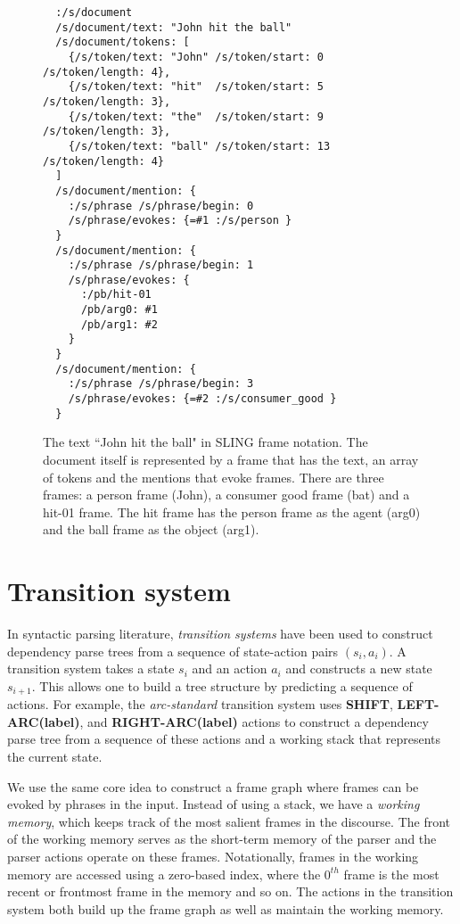 \documentclass[11pt,a4paper]{article}
\begin{document}
\begin{figure*}[t]
  \begin{verbatim}
  :/s/document
  /s/document/text: "John hit the ball"
  /s/document/tokens: [
    {/s/token/text: "John" /s/token/start: 0  /s/token/length: 4},
    {/s/token/text: "hit"  /s/token/start: 5  /s/token/length: 3},
    {/s/token/text: "the"  /s/token/start: 9  /s/token/length: 3},
    {/s/token/text: "ball" /s/token/start: 13 /s/token/length: 4}
  ]
  /s/document/mention: {
    :/s/phrase /s/phrase/begin: 0
    /s/phrase/evokes: {=#1 :/s/person }
  }
  /s/document/mention: {
    :/s/phrase /s/phrase/begin: 1
    /s/phrase/evokes: {
      :/pb/hit-01
      /pb/arg0: #1
      /pb/arg1: #2
    }
  }
  /s/document/mention: {
    :/s/phrase /s/phrase/begin: 3
    /s/phrase/evokes: {=#2 :/s/consumer_good }
  }
\end{verbatim}
  \caption{The text ``John hit the ball" in SLING frame notation. The document
  itself is represented by a frame that has the text, an array of tokens and
  the mentions that evoke frames. There are three frames: a person frame (John),
  a consumer good frame (bat) and a hit-01 frame. The hit frame has the person
  frame as the agent (arg0) and the ball frame as the object (arg1).}
  \label{fig:slingdoc}
\end{figure*}

\section{Transition system}
\label{sec:ts}

In syntactic parsing literature, \emph{transition systems} have been
used to construct dependency parse trees from a sequence of state-action pairs
$(s_i,a_i)$. A transition system takes a state $s_i$ and an action $a_i$ and
constructs a new state $s_{i+1}$. This allows one to build a tree structure by
predicting a sequence of actions. For example, the \emph{arc-standard}
transition system \cite{nivre2006} uses {\bf SHIFT}, {\bf LEFT-ARC(label)}, and
{\bf RIGHT-ARC(label)} actions to construct a dependency parse tree from a
sequence of these actions and a working stack that represents the current state.

We use the same core idea to construct a frame graph where frames can be
evoked by phrases in the input. Instead of using a stack, we have a
\emph{working memory}, which keeps track of the most salient frames in the
discourse. The front of the working memory serves as the short-term memory of
the parser and the parser actions operate on these frames. Notationally, frames
in the working memory are accessed using a zero-based index, where the $0^{th}$ frame
is the most recent or frontmost frame in the memory and so on. The actions in the
transition system both build up the frame graph as well as maintain the
working memory.
\end{document}
